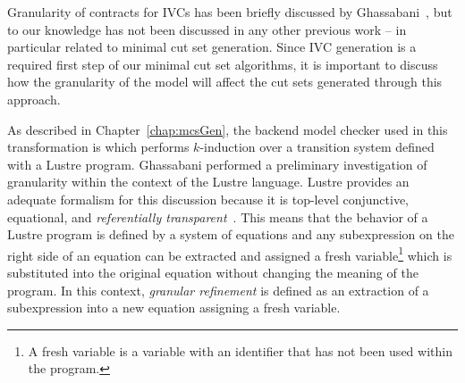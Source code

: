 Granularity of contracts for IVCs has been briefly discussed by Ghassabani~\cite{ghassabani_2018}, but to our knowledge has not been discussed in any other previous work -- in particular related to minimal cut set generation. Since IVC generation is a required first step of our minimal cut set algorithms, it is important to discuss how the granularity of the model will affect the cut sets generated through this approach. 

As described in Chapter~\ref{chap:mcsGen}, the backend model checker used in this transformation is \jkind which performs $k$-induction over a transition system defined with a Lustre program. Ghassabani performed a preliminary investigation of granularity within the context of the Lustre language. Lustre provides an adequate formalism for this discussion because it is top-level conjunctive, equational, and \textit{referentially transparent}~\cite{Halbwachs91:IEEE}. This means that the behavior of a Lustre program is defined by a system of equations and any subexpression on the right side of an equation can be extracted and assigned a fresh variable\footnote{A fresh variable is a variable with an identifier that has not been used within the program.} which is substituted into the original equation without changing the meaning of the program. In this context, \textit{granular refinement} is defined as an extraction of a subexpression into a new equation assigning a fresh variable. 



